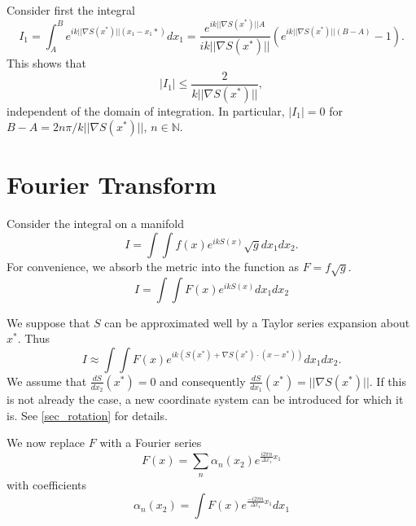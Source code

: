 \documentclass{article}
\newcommand{\norm}[1]{||#1||}
\theoremstyle{plain}
\begin{document}

Consider first the integral
\begin{equation}
	I_1 = \int_A^B e^{ik\norm{\nabla S(x^*)}(x_1-x_1*)} dx_1 = \frac{e^{ik\norm{\nabla S(x^*)}A}}{ik\norm{\nabla S(x^*)}} \left( e^{ik\norm{\nabla S(x^*)}(B-A)}-1 \right).
\end{equation}
This shows that
\begin{equation}
	|I_1| \leq \frac{2}{k\norm{\nabla S(x^*)}},
\end{equation}
independent of the domain of integration.
In particular, $|I_1| = 0$ for $B-A = 2n\pi / k\norm{\nabla S(x^*)}$, $n\in\mathbb{N}$.




\section{Fourier Transform}

Consider the integral on a manifold
\begin{equation}
	I = \int\int f(x) e^{ikS(x)} \sqrt{g} dx_1dx_2.
\end{equation}
For convenience, we absorb the metric into the function as  $F = f\sqrt{g}$.
\begin{equation}
	I = \int\int F(x) e^{ikS(x)} dx_1dx_2
\end{equation}



We suppose that $S$ can be approximated well by a Taylor series expansion about $x^*$.
Thus
\begin{equation}
	I \approx \int\int F(x) e^{ik\left(S(x^*) + \nabla S(x^*)\cdot (x-x^*) \right)} dx_1dx_2.
\end{equation}
We assume that $\frac{dS}{dx_2}(x^*) = 0$ and consequently $\frac{dS}{dx_1}(x^*) = \norm{\nabla S(x^*)}$.
If this is not already the case, a new coordinate system can be introduced for which it is. See \ref{sec_rotation} for details.


We now replace $F$ with a Fourier series
\begin{equation}
	F(x) = \sum_n \alpha_n(x_2) e^{ \frac{i2\pi n}{ \Delta x_1}x_1 }
\end{equation}
with coefficients
\begin{equation}
	\alpha_n(x_2) = \int F(x) e^{ \frac{-i2\pi n}{ \Delta x_1}x_1 } dx_1
\end{equation}
\end{document}
